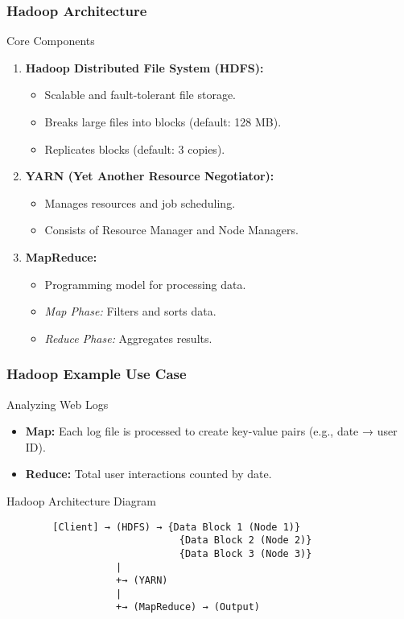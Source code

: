 \documentclass{beamer}
\begin{document}
\begin{frame}[fragile]
    \frametitle{Hadoop Architecture}
    \begin{block}{Core Components}
        \begin{enumerate}
            \item \textbf{Hadoop Distributed File System (HDFS):}
                \begin{itemize}
                    \item Scalable and fault-tolerant file storage.
                    \item Breaks large files into blocks (default: 128 MB).
                    \item Replicates blocks (default: 3 copies).
                \end{itemize}
            \item \textbf{YARN (Yet Another Resource Negotiator):}
                \begin{itemize}
                    \item Manages resources and job scheduling.
                    \item Consists of Resource Manager and Node Managers.
                \end{itemize}
            \item \textbf{MapReduce:}
                \begin{itemize}
                    \item Programming model for processing data.
                    \item \textit{Map Phase:} Filters and sorts data.
                    \item \textit{Reduce Phase:} Aggregates results.
                \end{itemize}
        \end{enumerate}
    \end{block}
\end{frame}

\begin{frame}[fragile]
    \frametitle{Hadoop Example Use Case}
    \begin{block}{Analyzing Web Logs}
        \begin{itemize}
            \item \textbf{Map:} Each log file is processed to create key-value pairs (e.g., date → user ID).
            \item \textbf{Reduce:} Total user interactions counted by date.
        \end{itemize}
    \end{block}
    
    \begin{block}{Hadoop Architecture Diagram}
        \begin{verbatim}
        [Client] → (HDFS) → {Data Block 1 (Node 1)}
                              {Data Block 2 (Node 2)}
                              {Data Block 3 (Node 3)}
                   |
                   +→ (YARN)
                   |
                   +→ (MapReduce) → (Output)
        \end{verbatim}
    \end{block}
\end{frame}
\end{document}
